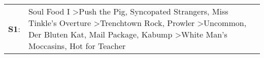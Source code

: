 \begin{supertabular}{p{0.03\textwidth}p{0.92\textwidth}}
 \textbf{S1}:  &  Soul Food I\textsuperscript{} \textgreater \enspace Push the Pig\textsuperscript{}, \enspace Syncopated Strangers\textsuperscript{}, \enspace Miss Tinkle's Overture\textsuperscript{} \textgreater \enspace Trenchtown Rock\textsuperscript{}, \enspace Prowler\textsuperscript{} \textgreater \enspace Uncommon\textsuperscript{}, \enspace Der Bluten Kat\textsuperscript{}, \enspace Mail Package\textsuperscript{}, \enspace Kabump\textsuperscript{} \textgreater \enspace White Man's Moccasins\textsuperscript{}, \enspace Hot for Teacher\textsuperscript{}  \enspace  \\
\end{supertabular}
